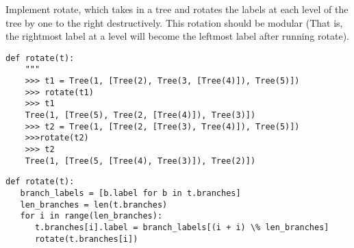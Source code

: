 \begin{blocksection}
\question Implement rotate, which takes in a tree and rotates the labels at each level of the tree by one to the right destructively. This rotation should be modular (That is, the rightmost label at a level will become the leftmost label after running rotate).
\newline
\begin{lstlisting}
def rotate(t):
    """
    >>> t1 = Tree(1, [Tree(2), Tree(3, [Tree(4)]), Tree(5)])
    >>> rotate(t1)
    >>> t1
    Tree(1, [Tree(5), Tree(2, [Tree(4)]), Tree(3)])
    >>> t2 = Tree(1, [Tree(2, [Tree(3), Tree(4)]), Tree(5)])
    >>>rotate(t2)
    >>> t2
    Tree(1, [Tree(5, [Tree(4), Tree(3)]), Tree(2)])
\end{lstlisting}
\begin{solution}
\begin{lstlisting}
def rotate(t):
   branch_labels = [b.label for b in t.branches]
   len_branches = len(t.branches)
   for i in range(len_branches):
      t.branches[i].label = branch_labels[(i + i) \% len_branches]
      rotate(t.branches[i])
\end{lstlisting}
\end{solution}
\end{blocksection}